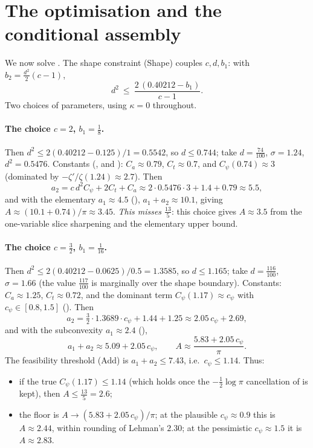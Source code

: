 \section{The optimisation and the conditional assembly}
\label{sec:ls_optim}

We now solve . The shape constraint \textup{(Shape)} couples
$c,d,b_1$: with $b_2=\tfrac{d^2}2(c-1)$,
\[
  d^2\ \le\ \frac{2\,(0.40212-b_1)}{c-1}.
\]
Two choices of parameters, using $\kappa=0$ throughout.

\paragraph{The choice $c=2$, $b_1=\tfrac18$.}
Then $d^2\le 2(0.40212-0.125)/1=0.5542$, so $d\le0.744$; take $d=\tfrac{74}{100}$,
$\sigma=1.24$, $d^2=0.5476$. Constants (,  and ):
$C_a\approx0.79$, $C_t\approx0.7$, and $C_\psi(0.74)\approx3$
(dominated by $-\zeta'/\zeta(1.24)\approx2.7$). Then
\[
  a_2=c\,d^2C_\psi+2C_t+C_a\approx 2\cdot0.5476\cdot3+1.4+0.79\approx5.5,
\]
and with the elementary $a_1\approx4.5$ (), $a_1+a_2\approx10.1$,
giving $A\approx(10.1+0.74)/\pi\approx3.45$. \emph{This misses $\tfrac{13}5$}: this choice
gives $A\approx3.5$ from the one-variable slice sharpening  and
the elementary upper bound.

\paragraph{The choice $c=\tfrac32$, $b_1=\tfrac1{16}$.}
Then $d^2\le2(0.40212-0.0625)/0.5=1.3585$, so $d\le1.165$; take
$d=\tfrac{116}{100}$, $\sigma=1.66$ (the value $\tfrac{117}{100}$ is marginally over the
shape boundary). Constants:
$C_a\approx1.25$, $C_t\approx0.72$, and the dominant term
$C_\psi(1.17)\approx c_\psi$ with $c_\psi\in[0.8,1.5]$ (). Then
\[
  a_2=\tfrac32\cdot1.3689\cdot c_\psi+1.44+1.25\approx2.05\,c_\psi+2.69,
\]
and with the subconvexity $a_1\approx2.4$ (),
\[
  a_1+a_2\approx 5.09+2.05\,c_\psi,
  \qquad
  A\approx\frac{5.83+2.05\,c_\psi}{\pi}.
\]
The feasibility threshold \textup{(Add)} is $a_1+a_2\le7.43$, i.e.\
$c_\psi\le1.14$. Thus:
\begin{itemize}
  \item if the true $C_\psi(1.17)\le1.14$ (which holds once the $-\tfrac12\log\pi$
        cancellation of \Cref{lem:ls_Cpsi} is kept), then $A\le\tfrac{13}5=2.6$;
  \item the floor is $A\to(5.83+2.05\,c_\psi)/\pi$; at the plausible
        $c_\psi\approx0.9$ this is $A\approx2.44$, within rounding of Lehman's
        $2.30$; at the pessimistic $c_\psi\approx1.5$ it is $A\approx2.83$.
\end{itemize}

